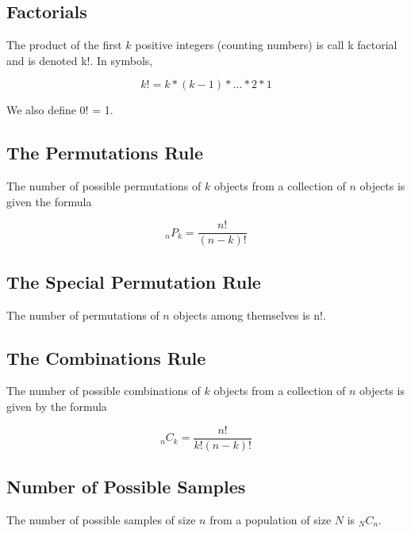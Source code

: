 \documentclass[12pt]{article}
\begin{document}
        \subsection*{Factorials}
            The product of the first $k$ positive integers (counting numbers) is call k factorial
            and is denoted k!. In symbols,
            \begin{center}
                \[
                    k! = k * (k-1) * \dots * 2 * 1
                \]
            \end{center}
            We also define 0! = 1.
        \subsection*{The Permutations Rule}
            The number of possible permutations of $k$ objects from a collection of $n$ objects 
            is given the formula
            \begin{center}
                \[
                    _nP_k = \frac{n!}{(n-k)!}
                \]
            \end{center}
        \subsection*{The Special Permutation Rule}
            The number of permutations of $n$ objects among themselves is n!.
        \subsection*{The Combinations Rule}
            The number of possible combinations of $k$ objects from a collection of $n$ objects 
            is given by the formula
            \begin{center}
                \[
                    _nC_k = \frac{n!}{k!(n-k)!}    
                \]                
            \end{center}
        \subsection*{Number of Possible Samples}
            The number of possible samples of size $n$ from a population of size $N$ is $_NC_n$.
\end{document}
